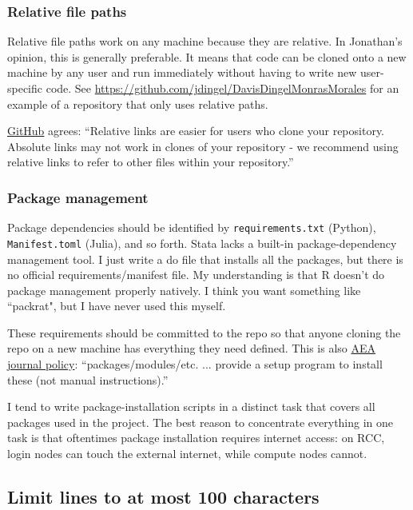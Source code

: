 \subsubsection{Relative file paths}

Relative file paths work on any machine because they are relative.
In Jonathan's opinion, this is generally preferable.
It means that code can be cloned onto a new machine by any user and run immediately without having to write new user-specific code.
See \url{https://github.com/jdingel/DavisDingelMonrasMorales} for an example of a repository that only uses relative paths.

\href{https://help.github.com/articles/about-readmes/\#relative-links-and-image-paths-in-readme-files}{GitHub} agrees:
``Relative links are easier for users who clone your repository. Absolute links may not work in clones of your repository - we recommend using relative links to refer to other files within your repository.''

\subsubsection{Package management}

Package dependencies should be identified by \texttt{requirements.txt} (Python), \texttt{Manifest.toml} (Julia), and so forth.
Stata lacks a built-in package-dependency management tool.
I just write a do file that installs all the packages, but there is no official requirements/manifest file.
My understanding is that R doesn't do package management properly natively.
I think you want something like ``packrat", but I have never used this myself.

These requirements should be committed to the repo so that anyone cloning the repo on a new machine has everything they need defined.
This is also \href{https://aeadataeditor.github.io/aea-de-guidance/preparing-for-data-deposit.html}{AEA journal policy}:
``packages/modules/etc. ... provide a setup program to install these (not manual instructions).''

I tend to write package-installation scripts in a distinct task that covers all packages used in the project.
The best reason to concentrate everything in one task is that oftentimes package installation requires internet access:
on RCC, login nodes can touch the external internet, while compute nodes cannot.

\subsection{Limit lines to at most 100 characters}


